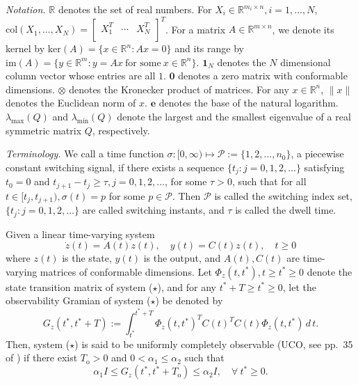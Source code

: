 \documentclass[twocolumn]{autart}
\newcommand{\RR}{\mathbb{R}}
\begin{document}
\medskip

\noindent
\emph{Notation.}
$\RR$ denotes the set of real numbers.
For $X_{i}\in \RR^{m_{i}\times n}, i=1,\ldots,N$,
$\text{col}\left(X_{1}, \ldots, X_{N}\right)=\left[
                                               \begin{array}{ccc}
                                                 X_{1}^{T} & \cdots & X_{N}^{T} \\
                                               \end{array}
                                             \right]^{T}
$.
For a matrix $A\in \RR^{m\times n}$, we denote its kernel by
$\text{ker}(A)=\{x\in \RR^{n} : Ax=0\}$
and its range by $\text{im}(A)=\{y \in \RR^{m}: y=Ax\ \text{for some}\ x\in \RR^{n}\}$.
$\mathbf{1}_{N}$ denotes the $N$ dimensional column vector whose entries are all $1$.
$\mathbf{0}$ denotes a zero matrix with conformable dimensions.
$\otimes$ denotes the Kronecker product of matrices.
For any $x\in \RR^{n}$, $\|x\|$ denotes the Euclidean norm of $x$.
$\mathbf{e}$ denotes the base of the natural logarithm.
$\lambda_{\max}(Q)$ and $\lambda_{\min}(Q)$ denote the largest and the smallest eigenvalue of
a real symmetric matrix $Q$, respectively.








\noindent
\emph{Terminology.}
We call a time function $\sigma:[0,\infty)\mapsto \mathcal{P}:=\{1,2,\ldots,n_{0}\}$,
a piecewise constant switching signal,
if there exists a sequence $\{t_{j}: j=0,1,2,\ldots\}$ satisfying
$t_{0}=0$ and $t_{j+1}-t_{j}\ge \tau, j=0,1,2,\ldots$, for some $\tau>0$,
such that for all $t\in [t_{j},t_{j+1}), \sigma(t)=p$ for some $p\in \mathcal{P}$.
Then $\mathcal{P}$ is called the switching index set,
$\{t_{j}: j=0,1,2,\ldots\}$ are called switching instants,
and $\tau$ is called the dwell time.

Given a linear time-varying system
\begin{equation}
    \dot{z}(t)=A(t)z(t), \quad y(t)=C(t)z(t), \quad t\ge 0 \tag{$\star$}
\end{equation}
where $z(t)$ is the state, $y(t)$ is the output,
and $A(t), C(t)$ are time-varying matrices of conformable dimensions.
Let $\Phi_{z}(t,t^{*}), t\ge t^{*} \ge 0$ denote the state transition matrix of system ($\star$),
and for any $t^{*}+T \ge t^{*} \ge 0$, let the observability Gramian of system ($\star$) be denoted by
\begin{equation*}
    G_{z}(t^{*},t^{*}+T):=\int_{t^{*}}^{t^{*}+T}\Phi_{z}(t,t^{*})^{T}C(t)^{T}C(t)\Phi_{z}(t,t^{*})\, d\, t.
\end{equation*}
Then, system ($\star$) is said to be uniformly completely observable (UCO, see pp.\ 35 of \cite{Sastry89})
if there exist $T_{\text{o}}>0$ and $0<\alpha_{1}\le \alpha_{2}$ such that
\begin{equation*}
   \alpha_{1}I \le G_{z}(t^{*},t^{*}+T_{\text{o}}) \le \alpha_{2}I,\quad \forall\ t^{*} \ge 0.
\end{equation*}
\end{document}
